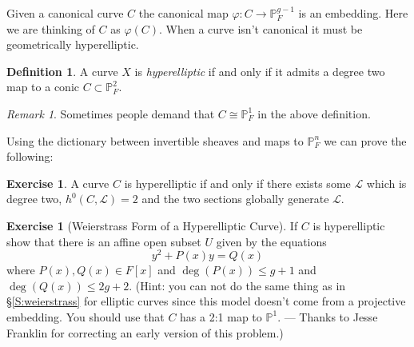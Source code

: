 \documentclass[12pt]{article}
\numberwithin{equation}{section}
\theoremstyle{definition}
\newtheorem{definition}[theorem]{Definition}
\newtheorem{exercise}[theorem]{Exercise}
\theoremstyle{remark}
\newtheorem{remark}[theorem]{Remark}
\newcommand{\PP}{\mathbb{P}}
\newcommand{\Lcal}{\mathcal{L}}
\begin{document}
Given a canonical curve $C$ the canonical map $\varphi: C \to \PP^{g-1}_F$
is an embedding. 
Here we are thinking of $C$ as $\varphi(C)$.
When a curve isn't canonical it must be geometrically hyperelliptic. 

\begin{definition}
	A curve $X$ is \emph{hyperelliptic} if and only if it admits a degree two map to a conic $C\subset \PP^2_F$.
\end{definition}

\begin{remark}
	Sometimes people demand that $C \cong \PP^1_F$ in the above definition. 
\end{remark}

Using the dictionary between invertible sheaves and maps to $\PP^n_F$ we can prove the following:
\begin{exercise}
	A curve $C$ is hyperelliptic if and only if there exists some $\Lcal$ which is degree two, $h^0(C,\Lcal)=2$ and the two sections globally generate $\Lcal$.
\end{exercise}

\begin{exercise}[Weierstrass Form of a Hyperelliptic Curve]
	If $C$ is hyperelliptic show that there is an affine open subset $U$ given by the equations 
	$$ y^2+P(x)y = Q(x) $$
	where $P(x),Q(x) \in F[x]$ and $\deg(P(x))\leq g+1$ and $\deg(Q(x))\leq 2g+2$.
	(Hint:  you can not do the same thing as in \S\ref{S:weierstrass} for elliptic curves since this model doesn't come from a projective embedding. You should use that $C$ has a 2:1 map to $\PP^1$. ---
	Thanks to Jesse Franklin for correcting an early version of this problem.) 
\end{exercise}
\end{document}
